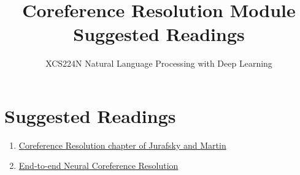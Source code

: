 \documentclass{article}
\title{Coreference Resolution Module Suggested Readings}
\author{XCS224N Natural Language Processing with Deep Learning}
\date{}
\begin{document}
\maketitle

\section{Suggested Readings}
\begin{enumerate}
    \item \href{https://web.stanford.edu/~jurafsky/slp3/22.pdf}{Coreference Resolution chapter of Jurafsky and Martin}
    \item \href{https://arxiv.org/pdf/1707.07045.pdf}{End-to-end Neural Coreference Resolution}
\end{enumerate}
\end{document}

